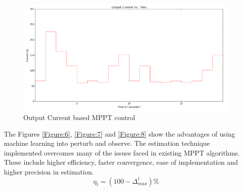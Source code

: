\begin{center}
\begin{figure}
\includegraphics[width=12cm,keepaspectratio]{9.png}
\caption {Output Current based MPPT control}
\label{Figure:10}    
\end{figure}
\end{center}
The Figures \ref{Figure:6}, \ref{Figure:7} and \ref{Figure:8} show the advantages of using machine learning into perturb and observe. The estimation technique implemented overcomes many of the issues faced in existing MPPT algorithms. These include higher efficiency, faster convergence, ease of implementation and higher precision in estimation.
\begin{equation} \label{eq:10}
\eta_t  = (100 - \Delta_{max}^t)\%
\end{equation}
